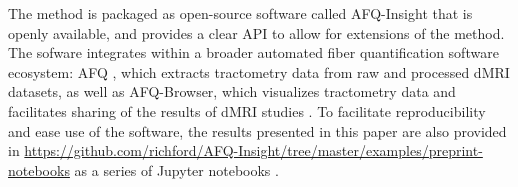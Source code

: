 The method is packaged as open-source software called AFQ-Insight
that is openly available, and provides a clear API to allow
for extensions of the method. The sofware integrates within a
broader automated fiber quantification software ecosystem: AFQ
\cite{yeatman2012tract}, which extracts tractometry data from raw and
processed dMRI datasets, as well as AFQ-Browser, which visualizes
tractometry data and facilitates sharing of the results of dMRI studies
\cite{yeatman2018browser}. To facilitate reproducibility and ease use
of the software, the results presented
in this paper are also provided in
\url{https://github.com/richford/AFQ-Insight/tree/master/examples/preprint-notebooks} as a series of Jupyter notebooks
\cite{kluyver2016jupyter}.

